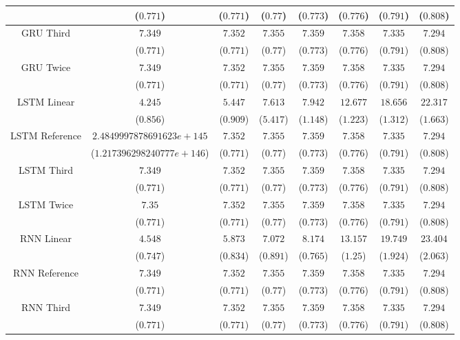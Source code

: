 \begin{table}[!ht]
{\begin{tabular}{|c|c|c|c|c|c|c|c|}
			 & ($0.771$) & ($0.771$) & ($0.77$) & ($0.773$) & ($0.776$) & ($0.791$) & ($0.808$) \\ \hline
			\multirow{2}{*}{GRU Third} & $7.349$ & $7.352$ & $7.355$ & $7.359$ & $7.358$ & $7.335$ & $7.294$ \\
			 & ($0.771$) & ($0.771$) & ($0.77$) & ($0.773$) & ($0.776$) & ($0.791$) & ($0.808$) \\ \hline
			\multirow{2}{*}{GRU Twice} & $7.349$ & $7.352$ & $7.355$ & $7.359$ & $7.358$ & $7.335$ & $7.294$ \\
			 & ($0.771$) & ($0.771$) & ($0.77$) & ($0.773$) & ($0.776$) & ($0.791$) & ($0.808$) \\ \hline
			\multirow{2}{*}{LSTM Linear} & $4.245$ & $5.447$ & $7.613$ & $7.942$ & $12.677$ & $18.656$ & $22.317$ \\
			 & ($0.856$) & ($0.909$) & ($5.417$) & ($1.148$) & ($1.223$) & ($1.312$) & ($1.663$) \\ \hline
			\multirow{2}{*}{LSTM Reference} & $2.4849997878691623e+145$ & $7.352$ & $7.355$ & $7.359$ & $7.358$ & $7.335$ & $7.294$ \\
			 & ($1.217396298240777e+146$) & ($0.771$) & ($0.77$) & ($0.773$) & ($0.776$) & ($0.791$) & ($0.808$) \\ \hline
			\multirow{2}{*}{LSTM Third} & $7.349$ & $7.352$ & $7.355$ & $7.359$ & $7.358$ & $7.335$ & $7.294$ \\
			 & ($0.771$) & ($0.771$) & ($0.77$) & ($0.773$) & ($0.776$) & ($0.791$) & ($0.808$) \\ \hline
			\multirow{2}{*}{LSTM Twice} & $7.35$ & $7.352$ & $7.355$ & $7.359$ & $7.358$ & $7.335$ & $7.294$ \\
			 & ($0.771$) & ($0.771$) & ($0.77$) & ($0.773$) & ($0.776$) & ($0.791$) & ($0.808$) \\ \hline
			\multirow{2}{*}{RNN Linear} & $4.548$ & $5.873$ & $7.072$ & $8.174$ & $13.157$ & $19.749$ & $23.404$ \\
			 & ($0.747$) & ($0.834$) & ($0.891$) & ($0.765$) & ($1.25$) & ($1.924$) & ($2.063$) \\ \hline
			\multirow{2}{*}{RNN Reference} & $7.349$ & $7.352$ & $7.355$ & $7.359$ & $7.358$ & $7.335$ & $7.294$ \\
			 & ($0.771$) & ($0.771$) & ($0.77$) & ($0.773$) & ($0.776$) & ($0.791$) & ($0.808$) \\ \hline
			\multirow{2}{*}{RNN Third} & $7.349$ & $7.352$ & $7.355$ & $7.359$ & $7.358$ & $7.335$ & $7.294$ \\
			 & ($0.771$) & ($0.771$) & ($0.77$) & ($0.773$) & ($0.776$) & ($0.791$) & ($0.808$) \\ \hline

\end{tabular}}
\end{table}
